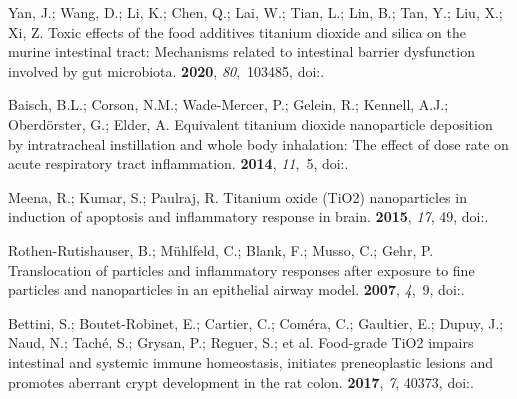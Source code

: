 \documentclass[ijms,article,accept,moreauthors,pdftex]{Definitions/mdpi}
\begin{document}
\begin{thebibliography}{999}
Yan, J.; Wang, D.; Li, K.; Chen, Q.; Lai, W.; Tian, L.; Lin, B.; Tan, Y.; Liu,
  X.; Xi, Z.
\newblock Toxic effects of the food additives titanium dioxide and silica on
  the murine intestinal tract: Mechanisms related to intestinal barrier
  dysfunction involved by gut microbiota.
 {\bf 2020}, {\em
  80},~103485,
\newblock
  doi:{\href{https://doi.org/10.1016/j.etap.2020.103485}{}}.

Baisch, B.L.; Corson, N.M.; Wade-Mercer, P.; Gelein, R.; Kennell, A.J.;
  Oberd\"{o}rster, G.; Elder, A.
\newblock Equivalent titanium dioxide nanoparticle deposition by intratracheal
  instillation and whole body inhalation: The effect of dose rate on acute
  respiratory tract inflammation.
 {\bf 2014}, {\em 11},~5,
\newblock
  doi:{\href{https://doi.org/10.1186/1743-8977-11-5}{}}.

Meena, R.; Kumar, S.; Paulraj, R.
\newblock Titanium oxide ({TiO}2) nanoparticles in induction of apoptosis and
  inflammatory response in brain.
 {\bf 2015}, {\em 17}, 49, 
\newblock
  doi:{\href{https://doi.org/10.1007/s11051-015-2868-x}{}}.

Rothen-Rutishauser, B.; M\"{u}hlfeld, C.; Blank, F.; Musso, C.; Gehr, P.
\newblock Translocation of particles and inflammatory responses after exposure
  to fine particles and nanoparticles in an epithelial airway model.
 {\bf 2007}, {\em 4},~9,
\newblock
  doi:{\href{https://doi.org/10.1186/1743-8977-4-9}{}}.

Bettini, S.; Boutet-Robinet, E.; Cartier, C.; Com{\'{e}}ra, C.; Gaultier, E.;
  Dupuy, J.; Naud, N.; Tach{\'{e}}, S.; Grysan, P.; Reguer, S.; et al.
\newblock Food-grade {TiO}2 impairs intestinal and systemic immune homeostasis,
  initiates preneoplastic lesions and promotes aberrant crypt development in
  the rat colon.
 {\bf 2017}, {\em 7}, 40373, 
\newblock
  doi:{\href{https://doi.org/10.1038/srep40373}{}}.


\end{thebibliography}
\end{document}
